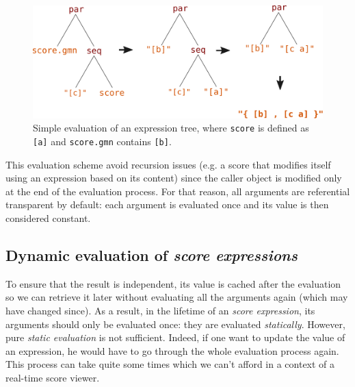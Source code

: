 \documentclass{article}
\newcommand{\OSC}[1]{\texttt{#1}}
\newcommand{\sExpr}{\emph{score expressions}}
\begin{document}
\begin{figure}[th]
\centering
\includegraphics[width=1\columnwidth]{imgs/classicEval}
\caption{Simple evaluation of an expression tree,
where \OSC{score} is defined as \OSC{[a]}
and \OSC{score.gmn} contains \OSC{[b]}.
\label{fig:classicEval} }
\end{figure}

This evaluation scheme avoid recursion issues (e.g. a score that modifies itself using an expression based on its content) since the caller object is modified only at the end of the evaluation process. For that reason, all arguments are referential transparent by default: each argument is evaluated once and its value is then considered constant.

\subsection{Dynamic evaluation of \sExpr}

To ensure that the result is independent, its value is cached after the evaluation so we can retrieve it later without evaluating all the arguments again (which may have changed since). As a result, in the lifetime of an \emph{score expression}, its arguments should only be evaluated once: they are evaluated \emph{statically}.
However, pure \emph{static evaluation} is not sufficient. Indeed, if one want to update the value of an expression, he would have to go through the whole evaluation process again. This process can take quite some times which we can't afford in a context of a real-time score viewer.
\end{document}
